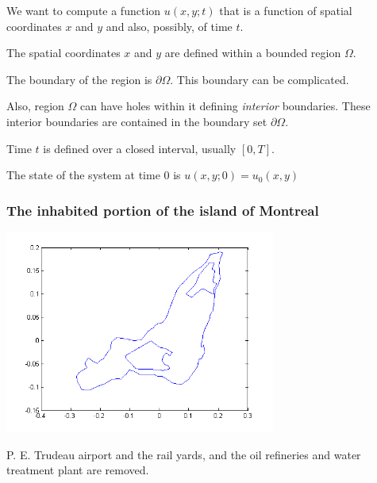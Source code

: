 \documentclass[11pt]{beamer}
\begin{document}
\begin{frame}

\bi
  \item We want to compute a function $u(x,y; t)$ that is a function of spatial
  coordinates $x$ and $y$ and also, possibly, of time $t$.
  \item The spatial coordinates $x$ and $y$ are defined within a bounded
  region $\Omega$.
  \item The boundary of the region is $\partial \Omega$.  This
  boundary can be complicated.
  \item Also, region $\Omega$ can have holes
  within it defining \emph{interior} boundaries.  These interior
  boundaries are contained in the boundary set $\partial \Omega$.
  \item Time $t$ is defined over a closed interval, usually $[0,T]$.
  \item The state of the system at time 0 is $u(x,y; 0) = u_0(x,y)$
\ei

\end{frame}


\begin{frame}

\frametitle{The inhabited portion of the island of Montreal}

\includegraphics[width=3.5in]{figs/mtl_geometry.png}

P. E. Trudeau airport and the rail yards,  and the oil refineries
and water treatment plant are removed.

\end{frame}


\end{document}
